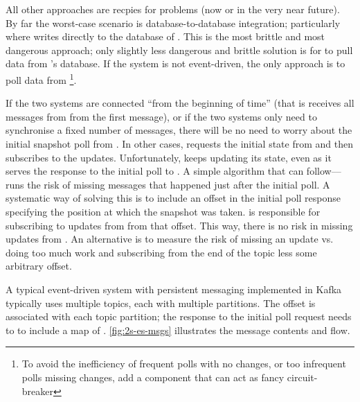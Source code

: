 \documentclass[10 pt, twocolumn]{article}
\begin{document}


All other approaches are recpies for problems (now or in the very near future). By far the worst-case scenario is database-to-database integration; particularly where  writes directly to the database of . This is the most brittle and most dangerous approach; only slightly less dangerous and brittle solution is for  to pull data from 's database. If the system  is not event-driven, the only approach is to poll data from \footnote{To avoid the inefficiency of frequent polls with no changes, or too infrequent polls missing changes, add a component that can act as fancy circuit-breaker}. 

If the two systems are connected ``from the beginning of time'' (that is  receives all messages from  from the first message), or if the two systems only need to synchronise a fixed number of messages, there will be no need to worry about the initial snapshot poll from . In other cases,  requests the initial state from  and then subscribes to the updates. Unfortunately,  keeps updating its state, even as it serves the response to the initial poll to . A simple algorithm that  can follow----runs the risk of missing messages that happened just after the initial poll. A systematic way of solving this is to include an offset in the initial poll response specifying the position at which the snapshot was taken.  is responsible for subscribing to updates from  from that offset. This way, there is no risk in missing updates from . An alternative is to measure the risk of missing an update vs. doing too much work and subscribing from the end of the topic less some arbitrary offset.

A typical event-driven system with persistent messaging implemented in Kafka typically uses multiple topics, each with multiple partitions. The offset is associated with each topic partition; the response to the initial poll request needs to to include a map of . \autoref{fig:2s-es-msgs} illustrates the message contents and flow.
\end{document}

